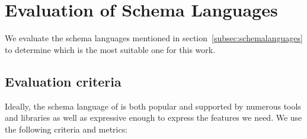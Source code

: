 \section{Evaluation of Schema Languages}\label{sec:evaluation-of-schema-languages}


We evaluate the schema languages mentioned in section~\ref{subsec:schemalanguages} to determine which is the most suitable one for this work.


\subsection{Evaluation criteria}\label{subsec:evaluation-criteria} %

Ideally, the schema language of \toolname{} is both popular and supported by numerous tools and libraries as well as expressive enough to express the features we need.
We use the following criteria and metrics:
